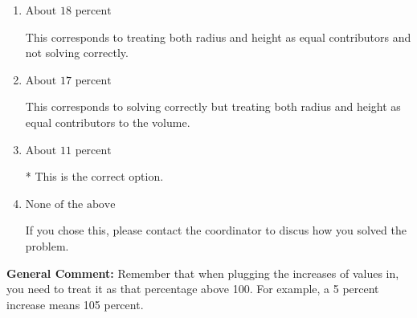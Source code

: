 \documentclass{extbook}[14pt]
\begin{document}
\begin{enumerate}
{\begin{enumerate}[label=\Alph*.]
This corresponds to not solving for the increase properly.
\item \( \text{About } 18 \text{ percent} \)

This corresponds to treating both radius and height as equal contributors and not solving correctly.
\item \( \text{About } 17 \text{ percent} \)

This corresponds to solving correctly but treating both radius and height as equal contributors to the volume.
\item \( \text{About } 11 \text{ percent} \)

* This is the correct option.
\item \( \text{None of the above} \)

If you chose this, please contact the coordinator to discus how you solved the problem.
\end{enumerate}

\textbf{General Comment:} Remember that when plugging the increases of values in, you need to treat it as that percentage above 100. For example, a 5 percent increase means 105 percent.
}
\end{enumerate}
\end{document}

